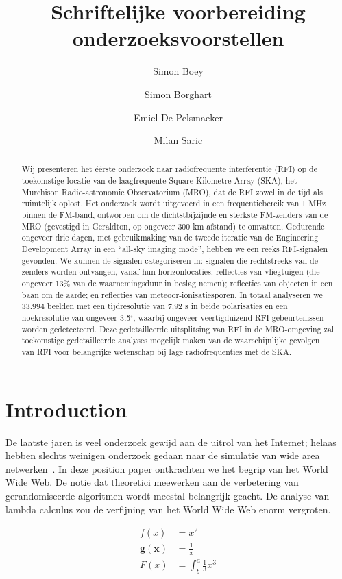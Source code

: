 \documentclass{hogent-article}
\title{Schriftelijke voorbereiding onderzoeksvoorstellen}
\author{Simon Boey}
\author{Simon Borghart}
\author{Emiel De Pelsmaeker}
\author{Milan Saric}
\begin{document}
\begin{abstract}
  Wij presenteren het éérste onderzoek naar radiofrequente interferentie (RFI) op de toekomstige locatie van de laagfrequente Square Kilometre Array (SKA), het Murchison Radio-astronomie Observatorium (MRO), dat de RFI zowel in de tijd als ruimtelijk oplost.  Het onderzoek wordt uitgevoerd in een frequentiebereik van 1 MHz binnen de FM-band, ontworpen om de dichtstbijzijnde en sterkste FM-zenders van de MRO (gevestigd in Geraldton, op ongeveer 300 km afstand) te omvatten.  Gedurende ongeveer drie dagen, met gebruikmaking van de tweede iteratie van de Engineering Development Array in een ``all-sky imaging mode'', hebben we een reeks RFI-signalen gevonden.  We kunnen de signalen categoriseren in: signalen die rechtstreeks van de zenders worden ontvangen, vanaf hun horizonlocaties; reflecties van vliegtuigen (die ongeveer 13\% van de waarnemingsduur in beslag nemen); reflecties van objecten in een baan om de aarde; en reflecties van meteoor-ionisatiesporen.  In totaal analyseren we 33.994 beelden met een tijdresolutie van 7,92 s in beide polarisaties en een hoekresolutie van ongeveer 3,5$^{\circ}$, waarbij ongeveer veertigduizend RFI-gebeurtenissen worden gedetecteerd.  Deze gedetailleerde uitsplitsing van RFI in de MRO-omgeving zal toekomstige gedetailleerde analyses mogelijk maken van de waarschijnlijke gevolgen van RFI voor belangrijke wetenschap bij lage radiofrequenties met de SKA.
\end{abstract}

\tableofcontents

\section{Introduction}%
\label{sec:introduction}

De laatste jaren is veel onderzoek gewijd aan de uitrol van het Internet; helaas hebben slechts weinigen onderzoek gedaan naar de simulatie van wide area netwerken~\autocite{Hykes2013}. In deze position paper ont\-krach\-ten we het begrip van het World Wide Web. De notie dat theoretici meewerken aan de verbetering van gerandomiseerde algoritmen wordt meestal belangrijk geacht. De analyse van lambda calculus zou de verfijning van het World Wide Web enorm vergroten.

\begin{align*}
  f(x) &= x^2\\
  \mathbf{ g(x) } &= \frac{1}{x}\\
   F(x)  &= \int^a_b \frac{1}{3}x^3\\
\end{align*}
\end{document}
